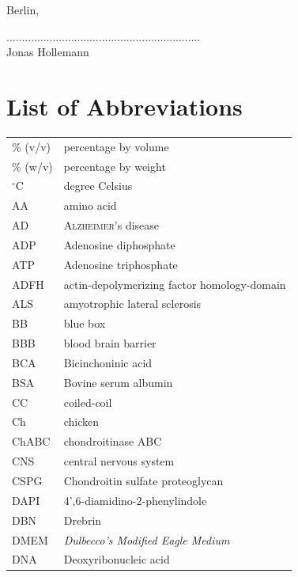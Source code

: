 \documentclass[a4paper,11pt,bibtotocnumbered]{article}
\begin{document}
\vspace{1cm}
Berlin,
\vspace{1cm}

............................................................... \\
Jonas Hollemann


\newpage

\tableofcontents
\newpage
\section*{List of Abbreviations}

\renewcommand{\arraystretch}{.9}
\begin{small}

\begin{longtabu}{p{3cm}X}
\% (v/v) & percentage by volume\\
\% (w/v) & percentage by weight\\
$^\circ$C & degree Celsius\\
AA&amino acid\\
AD&\textsc{Alzheimer}'s disease\\
ADP& Adenosine diphosphate\\
ATP& Adenosine triphosphate\\
ADFH&actin-depolymerizing factor homology-domain\\
ALS&amyotrophic lateral sclerosis\\
BB& blue box\\
BBB& blood brain barrier\\
BCA&Bicinchoninic acid \\
BSA & Bovine serum albumin\\
CC& coiled-coil\\
Ch& chicken\\
ChABC&chondroitinase ABC\\
CNS&central nervous system\\
CSPG&Chondroitin sulfate proteoglycan\\
DAPI&4',6-diamidino-2-phenylindole\\
DBN & Drebrin\\
DMEM & \textit{Dulbecco's Modified Eagle Medium}\\
DNA & Deoxyribonucleic acid\\

\end{longtabu}
\end{small}
\end{document}
